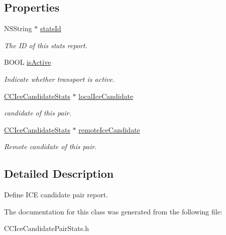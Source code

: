\subsection*{Properties}
\begin{DoxyCompactItemize}
\item 
\mbox{\label{interface_c_c_ice_candidate_pair_stats_a0927e26a14f3e2df28ec5e123568bea4}} 
N\+S\+String $\ast$ \hyperlink{interface_c_c_ice_candidate_pair_stats_a0927e26a14f3e2df28ec5e123568bea4}{stats\+Id}
\begin{DoxyCompactList}\small\item\em The ID of this stats report. \end{DoxyCompactList}\item 
\mbox{\label{interface_c_c_ice_candidate_pair_stats_a52b08bcab2da9e8e19a4ebbe9a4e43c4}} 
B\+O\+OL \hyperlink{interface_c_c_ice_candidate_pair_stats_a52b08bcab2da9e8e19a4ebbe9a4e43c4}{is\+Active}
\begin{DoxyCompactList}\small\item\em Indicate whether transport is active. \end{DoxyCompactList}\item 
\mbox{\label{interface_c_c_ice_candidate_pair_stats_a80e27f274c23799031cd4feca045cbdd}} 
\hyperlink{interface_c_c_ice_candidate_stats}{C\+C\+Ice\+Candidate\+Stats} $\ast$ \hyperlink{interface_c_c_ice_candidate_pair_stats_a80e27f274c23799031cd4feca045cbdd}{local\+Ice\+Candidate}
\begin{DoxyCompactList}\small\item\em candidate of this pair. \end{DoxyCompactList}\item 
\mbox{\label{interface_c_c_ice_candidate_pair_stats_afef35a2c085d29e8092f243a0d223876}} 
\hyperlink{interface_c_c_ice_candidate_stats}{C\+C\+Ice\+Candidate\+Stats} $\ast$ \hyperlink{interface_c_c_ice_candidate_pair_stats_afef35a2c085d29e8092f243a0d223876}{remote\+Ice\+Candidate}
\begin{DoxyCompactList}\small\item\em Remote candidate of this pair. \end{DoxyCompactList}\end{DoxyCompactItemize}


\subsection{Detailed Description}
Define I\+CE candidate pair report. 

The documentation for this class was generated from the following file\+:\begin{DoxyCompactItemize}
\item 
C\+C\+Ice\+Candidate\+Pair\+Stats.\+h\end{DoxyCompactItemize}
